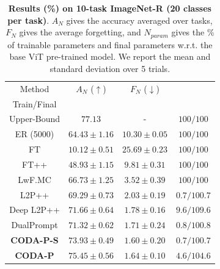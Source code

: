 \begin{table}[t]
\caption{\textbf{Results (\%) on 10-task ImageNet-R (20 classes per task)}. $A_N$ gives the accuracy averaged over tasks, $F_N$ gives the average forgetting, and $N_{param}$ gives the \% of trainable parameters and final parameters w.r.t. the base ViT pre-trained model. We report the mean and standard deviation over 5 trials.}
\vspace{-2mm}
\centering
\label{tab_2:imnet-r_10}
\begin{tabular}{c||c|c|c} 
\hline
\rule{0pt}{10pt} Method & $A_N$ ($\uparrow$) & $F_N$ ($\downarrow$) & \thead{$N_{param}$ ($\downarrow$) \\ Train/Final}\\
\hline
Upper-Bound  & $77.13$ & - & $100/100$  \\  
\hline
ER (5000)    & $64.43 \pm 1.16$ & $10.30 \pm 0.05$ & $100/100$  \\ 
FT           & $10.12 \pm 0.51$ & $25.69 \pm 0.23$ & $100/100$  \\ 
FT++         & $48.93 \pm 1.15$ & $9.81 \pm 0.31$ & $100/100$  \\
LwF.MC       & $66.73 \pm 1.25$ & $3.52 \pm 0.39$ & $100/100$ \\
L2P++        & $69.29 \pm 0.73$ & $2.03 \pm 0.19$ & $ 0.7/100.7$  \\
Deep L2P++   & $71.66 \pm 0.64$ & $1.78 \pm 0.16$ & $ 9.6/109.6$  \\  
DualPrompt   & $71.32 \pm 0.62$ & $1.71 \pm 0.24$ & $ 0.8/100.8$  \\
\hdashline
\textbf{CODA-P-S}  & $73.93 \pm 0.49$ & $\bm{1.60 \pm 0.20}$ & $ 0.7/100.7$  \\
\textbf{CODA-P}    & $\bm{75.45 \pm 0.56}$ & $1.64 \pm 0.10$ & $ 4.6/104.6$  \\

\hline
\end{tabular}


\end{table}

